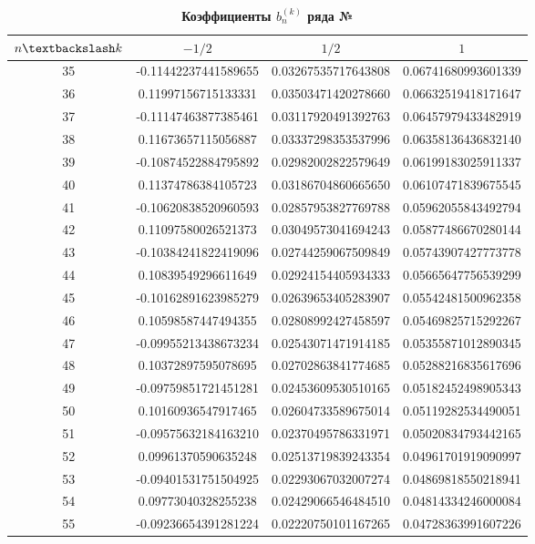 \begin{table}[]
\caption{\textbf{Коэффициенты $b_n^{(k)}$ ряда №}}
\begin{center}
\begin{tabular}{|c|c|c|c|}
\hline
$n \textbackslash k$ & $-1/2$ & $1/2$ & $1$ \\
\hline
35 & -0.11442237441589655 & 0.03267535717643808 & 0.06741680993601339 \\
36 &  0.11997156715133331 & 0.03503471420278660 & 0.06632519418171647 \\
37 & -0.11147463877385461 & 0.03117920491392763 & 0.06457979433482919 \\
38 &  0.11673657115056887 & 0.03337298353537996 & 0.06358136436832140 \\
39 & -0.10874522884795892 & 0.02982002822579649 & 0.06199183025911337 \\
40 &  0.11374786384105723 & 0.03186704860665650 & 0.06107471839675545 \\
41 & -0.10620838520960593 & 0.02857953827769788 & 0.05962055843492794 \\
42 &  0.11097580026521373 & 0.03049573041694243 & 0.05877486670280144 \\
43 & -0.10384241822419096 & 0.02744259067509849 & 0.05743907427773778 \\
44 &  0.10839549296611649 & 0.02924154405934333 & 0.05665647756539299 \\
45 & -0.10162891623985279 & 0.02639653405283907 & 0.05542481500962358 \\
46 &  0.10598587447494355 & 0.02808992427458597 & 0.05469825715292267 \\
47 & -0.09955213438673234 & 0.02543071471914185 & 0.05355871012890345 \\
48 &  0.10372897595078695 & 0.02702863841774685 & 0.05288216835617696 \\
49 & -0.09759851721451281 & 0.02453609530510165 & 0.05182452498905343 \\
50 &  0.10160936547917465 & 0.02604733589675014 & 0.05119282534490051 \\
51 & -0.09575632184163210 & 0.02370495786331971 & 0.05020834793442165 \\
52 &  0.09961370590635248 & 0.02513719839243354 & 0.04961701919090997 \\
53 & -0.09401531751504925 & 0.02293067032007274 & 0.04869818550218941 \\
54 &  0.09773040328255238 & 0.02429066546484510 & 0.04814334246000084 \\
55 & -0.09236654391281224 & 0.02220750101167265 & 0.04728363991607226 \\

\end{tabular}
\end{center}
\end{table}
